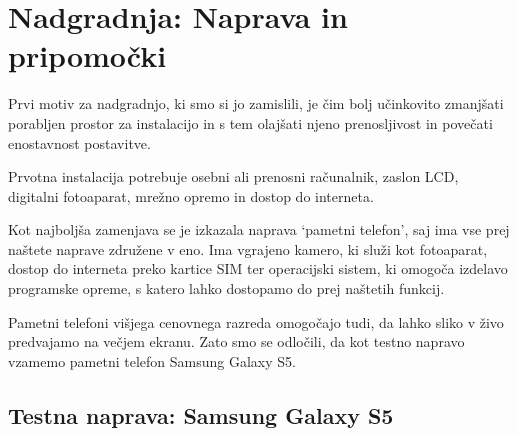 \documentclass[a4paper, 12pt]{book}
\begin{document}
\chapter{Nadgradnja: Naprava in pripomočki}
\label{ch:nadgradnjaNapravaPripomocki}
Prvi motiv za nadgradnjo, ki smo si jo zamislili, je čim bolj učinkovito zmanjšati
porabljen prostor za instalacijo in s tem olajšati njeno prenosljivost in
povečati enostavnost postavitve.

Prvotna instalacija potrebuje osebni ali prenosni računalnik, zaslon LCD,
digitalni fotoaparat, mrežno opremo in dostop do interneta.

Kot najboljša zamenjava se je izkazala naprava `pametni telefon', saj ima
vse prej naštete naprave združene v eno. Ima vgrajeno kamero, ki služi kot
fotoaparat, dostop do interneta preko kartice SIM ter operacijski sistem, ki
omogoča izdelavo programske opreme, s katero lahko dostopamo do prej naštetih
funkcij.

Pametni telefoni višjega cenovnega razreda omogočajo tudi, da lahko sliko v živo
predvajamo na večjem ekranu. Zato smo se odločili, da kot testno napravo
vzamemo pametni telefon Samsung Galaxy S5.

\section{Testna naprava: Samsung Galaxy S5}
\label{sec:testnaNapravaSmartPhone}
\end{document}
